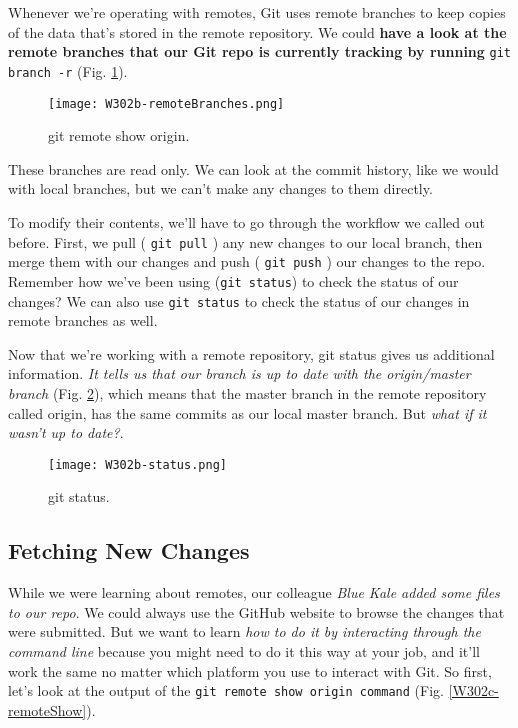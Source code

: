 Whenever we're operating with remotes, Git uses remote branches to keep copies of the data that's stored in the remote repository. We could \textbf{have a look at the remote branches that our Git repo is currently tracking by running} \verb|git branch -r| (Fig. \ref{W302b-remoteBranches}).

\begin{figure} 
	\caption{git remote show origin.}
	\centering
	\texttt{[image: W302b-remoteBranches.png]}
	\label{W302b-remoteBranches}
\end{figure}

These branches are read only. We can look at the commit history, like we would with local branches, but we can't make any changes to them directly. 

To modify their contents, we'll have to go through the workflow we called out before.
First, we pull ( \verb|git pull| ) any new changes to our local branch, then merge them with our changes and push ( \verb|git push| ) our changes to the repo. Remember how we've been using (\verb|git status|) to check the status of our changes? We can also use \verb|git status| to check the status of our changes in remote branches as well.

Now that we're working with a remote repository, git status gives us additional information. \textit{It tells us that our branch is up to date with the origin/master branch} (Fig. \ref{W302b-status}), which means that the master branch in the remote repository called origin, has the same commits as our local master branch. But \textit{what if it wasn't up to date?}.

\begin{figure} 
	\caption{git status.}
	\centering
	\texttt{[image: W302b-status.png]}
	\label{W302b-status}
\end{figure}


\subsection{Fetching New Changes} \label{W302c}

While we were learning about remotes, our colleague \textit{Blue Kale added some files to our repo}. We could always use the GitHub website to browse the changes that were submitted. But we want to learn \textit{how to do it by interacting through the command line} because you might need to do it this way at your job, and it'll work the same no matter which platform you use to interact with Git. So first, let's look at the output of the \verb|git remote show origin command| (Fig. \ref{W302c-remoteShow}).

